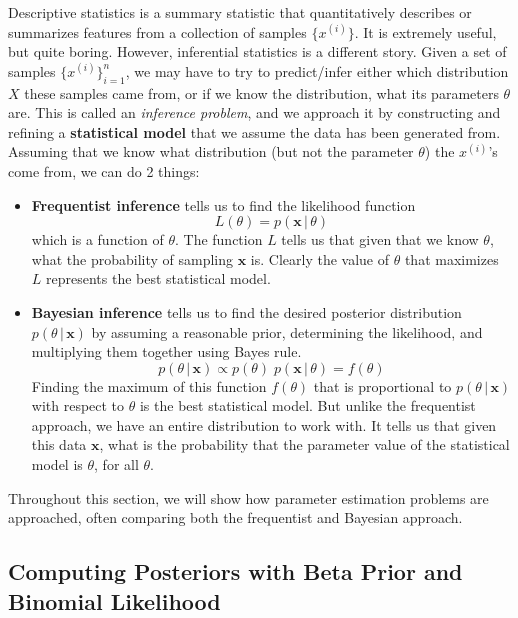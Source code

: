 \documentclass{article}
\begin{document}
  Descriptive statistics is a summary statistic that quantitatively describes or summarizes features from a collection of samples $\{x^{(i)}\}$. It is extremely useful, but quite boring. However, inferential statistics is a different story. Given a set of samples $\{x^{(i)}\}_{i=1}^n$, we may have to try to predict/infer either which distribution $X$ these samples came from, or if we know the distribution, what its parameters $\theta$ are. This is called an \textit{inference problem}, and we approach it by constructing and refining a \textbf{statistical model} that we assume the data has been generated from. Assuming that we know what distribution (but not the parameter $\theta$) the $x^{(i)}$'s come from, we can do 2 things:

  \begin{itemize}
    \item \textbf{Frequentist inference} tells us to find the likelihood function
    \begin{equation}
      L(\theta) = p(\mathbf{x}\,|\,\theta)
    \end{equation}
    which is a function of $\theta$. The function $L$ tells us that given that we know $\theta$, what the probability of sampling $\mathbf{x}$ is. Clearly the value of $\theta$ that maximizes $L$ represents the best statistical model.
    
    \item \textbf{Bayesian inference} tells us to find the desired posterior distribution $p(\theta\,|\,\mathbf{x})$ by assuming a reasonable prior, determining the likelihood, and multiplying them together using Bayes rule.
    \begin{equation}
      p(\theta\,|\,\mathbf{x}) \propto p(\theta)\; p(\mathbf{x}\,|\,\theta) = f(\theta)
    \end{equation}
    Finding the maximum of this function $f(\theta)$ that is proportional to $p(\theta\,|\,\mathbf{x})$ with respect to $\theta$ is the best statistical model. But unlike the frequentist approach, we have an entire distribution to work with. It tells us that given this data $\mathbf{x}$, what is the probability that the parameter value of the statistical model is $\theta$, for all $\theta$.
  \end{itemize}

  Throughout this section, we will show how parameter estimation problems are approached, often comparing both the frequentist and Bayesian approach.

  \subsection{Computing Posteriors with Beta Prior and Binomial Likelihood}
\end{document}
